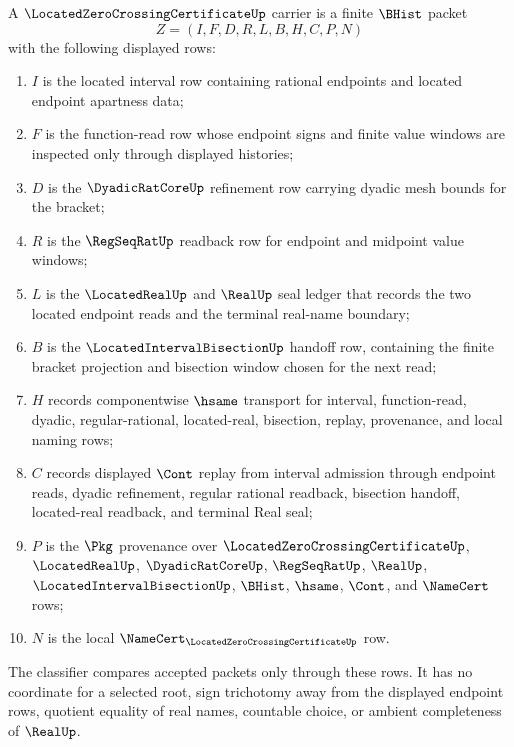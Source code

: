 \begin{definition}
\label{def:located-zero-crossing-certificate-carrier}
A $\LocatedZeroCrossingCertificateUp$ carrier is a finite $\BHist$ packet
$$
Z=(I,F,D,R,L,B,H,C,P,N)
$$
with the following displayed rows:
\begin{enumerate}
\item $I$ is the located interval row containing rational endpoints and located endpoint apartness data;
\item $F$ is the function-read row whose endpoint signs and finite value windows are inspected only through displayed histories;
\item $D$ is the $\DyadicRatCoreUp$ refinement row carrying dyadic mesh bounds for the bracket;
\item $R$ is the $\RegSeqRatUp$ readback row for endpoint and midpoint value windows;
\item $L$ is the $\LocatedRealUp$ and $\RealUp$ seal ledger that records the two located endpoint reads and the terminal real-name boundary;
\item $B$ is the $\LocatedIntervalBisectionUp$ handoff row, containing the finite bracket projection and bisection window chosen for the next read;
\item $H$ records componentwise $\hsame$ transport for interval, function-read, dyadic, regular-rational, located-real, bisection, replay, provenance, and local naming rows;
\item $C$ records displayed $\Cont$ replay from interval admission through endpoint reads, dyadic refinement, regular rational readback, bisection handoff, located-real readback, and terminal Real seal;
\item $P$ is the $\Pkg$ provenance over $\LocatedZeroCrossingCertificateUp$, $\LocatedRealUp$, $\DyadicRatCoreUp$, $\RegSeqRatUp$, $\RealUp$, $\LocatedIntervalBisectionUp$, $\BHist$, $\hsame$, $\Cont$, and $\NameCert$ rows;
\item $N$ is the local $\NameCert_{\LocatedZeroCrossingCertificateUp}$ row.
\end{enumerate}
The classifier compares accepted packets only through these rows. It has no coordinate for a selected root, sign trichotomy away from the displayed endpoint rows, quotient equality of real names, countable choice, or ambient completeness of $\RealUp$.
\end{definition}

